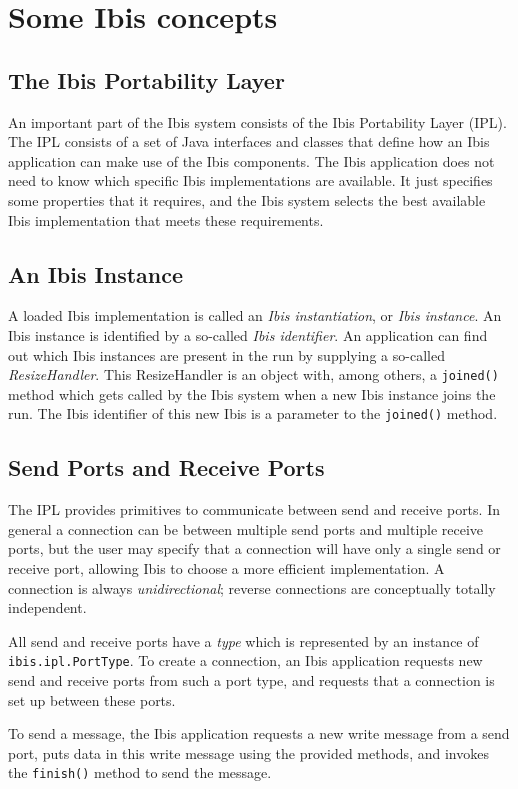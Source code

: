 \documentclass[10pt]{article}
\newcommand{\mysection}[1]{\section{#1}\label{#1}}
\newcommand{\mysubsection}[1]{\subsection{#1}\label{#1}}
\begin{document}
\mysection{Some Ibis concepts}

\mysubsection{The Ibis Portability Layer}

An important part of the Ibis system consists of the Ibis Portability Layer (IPL).
The IPL consists of a set of Java interfaces and classes that define how an Ibis application
can make use of the Ibis components.
The Ibis application does not need to know which specific Ibis implementations are
available.
It just specifies some properties that it requires, and the Ibis system
selects the best available Ibis implementation that meets these requirements.
 
\mysubsection{An Ibis Instance}

A loaded Ibis implementation is called an \emph{Ibis instantiation}, or 
\emph{Ibis instance}.
An Ibis instance is identified by a so-called
\emph{Ibis identifier}.
An application can find out which Ibis instances are present in the run
by supplying a so-called \emph{ResizeHandler}.
This ResizeHandler is an object with, among others, a \texttt{joined()}
method which gets called by the Ibis system when a new Ibis instance
joins the run.  The Ibis identifier of this new Ibis is a parameter
to the \texttt{joined()} method.

\mysubsection{Send Ports and Receive Ports}

The IPL provides primitives to communicate between send and receive ports.
In general a connection can be between multiple send ports and multiple
receive ports, but the user may specify that a connection will have only
a single send or receive port, allowing Ibis to choose a more efficient
implementation.  A connection is always \emph{unidirectional}; reverse
connections are conceptually totally independent.

All send and receive ports have a \emph{type} which is represented by an
instance of \texttt{ibis.ipl.PortType}.
To create a connection, an Ibis application requests new send and receive
ports from such a port type, and requests that a connection is set up 
between these ports.

To send a message, the Ibis application requests a new write message from
a send port, puts data in this write message using the provided methods,
and invokes the \texttt{finish()} method to send the message.
\end{document}
